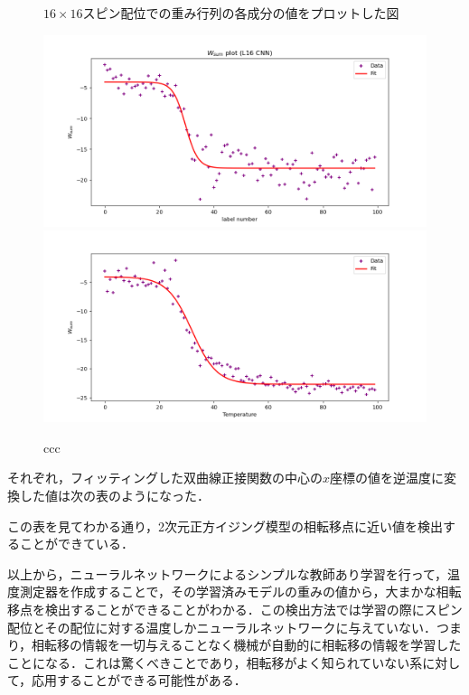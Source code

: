 \documentclass[a4paper,11pt]{jsreport}
\begin{document}
\begin{figure}[H]
\begin{minipage}[b]{0.45\linewidth}
\begin{center}
    \end{center}
  \end{minipage}
  \caption{$16 \times 16$スピン配位での重み行列の各成分の値をプロットした図}
  \label{温度測定器ヒートマップ16}
\end{figure}

\begin{figure}[H]
  \begin{center}
    \includegraphics[width=\linewidth]{image/L16_FCNN_weight_sum.png}
    \includegraphics[width=\linewidth]{image/L16_CNN_weight_sum_2.png}
  \end{center}
  \caption{ccc}
  \label{温度測定器プロット16}
\end{figure}

それぞれ，フィッティングした双曲線正接関数の中心の$x$座標の値を逆温度に変換した値は次の表のようになった．


この表を見てわかる通り，2次元正方イジング模型の相転移点に近い値を検出することができている．\par
以上から，ニューラルネットワークによるシンプルな教師あり学習を行って，温度測定器を作成することで，その学習済みモデルの重みの値から，大まかな相転移点を検出することができることがわかる．この検出方法では学習の際にスピン配位とその配位に対する温度しかニューラルネットワークに与えていない．つまり，相転移の情報を一切与えることなく機械が自動的に相転移の情報を学習したことになる．これは驚くべきことであり，相転移がよく知られていない系に対して，応用することができる可能性がある．
\end{document}
